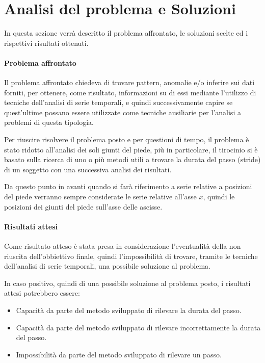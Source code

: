 \section{Analisi del problema e Soluzioni}
In questa sezione verrà descritto il problema affrontato, le soluzioni scelte ed i rispettivi
risultati ottenuti.

\paragraph{Problema affrontato}
Il problema affrontato chiedeva di trovare pattern, anomalie e/o inferire sui dati forniti, 
per ottenere, come risultato, informazioni su di essi mediante l'utilizzo di tecniche 
dell'analisi di serie temporali, e quindi successivamente capire se quest'ultime possano essere 
utilizzate come tecniche ausiliarie per l'analisi a problemi di questa tipologia.

Per riuscire risolvere il problema posto e per questioni di tempo, il problema è stato 
ridotto all'analisi dei soli giunti del piede, più in particolare,
il tirocinio si è basato sulla ricerca di uno o più metodi utili a trovare la durata del passo
(stride) di un soggetto con una successiva analisi dei risultati.

Da questo punto in avanti quando si farà riferimento a serie relative a posizioni del piede 
verranno sempre considerate le serie relative all'asse $x$, quindi le posizioni dei giunti del piede
sull'asse delle ascisse.

\paragraph{Risultati attesi}
\begin{sloppypar}
Come risultato atteso è stata presa in considerazione l'eventualità della non riuscita dell'obbiettivo finale,
quindi l'impossibilità di trovare, tramite le tecniche dell'analisi di serie temporali, una possibile soluzione
al problema.
\end{sloppypar}

In caso positivo, quindi di una possibile soluzione al problema posto, i risultati attesi potrebbero essere:
\begin{itemize}
    \setlength\itemsep{-0.5em}
    \item Capacità da parte del metodo sviluppato di rilevare la durata del passo.
    \item Capacità da parte del metodo sviluppato di rilevare incorrettamente la durata del passo.
    \item Impossibilità da parte del metodo sviluppato di rilevare un passo.
\end{itemize}


